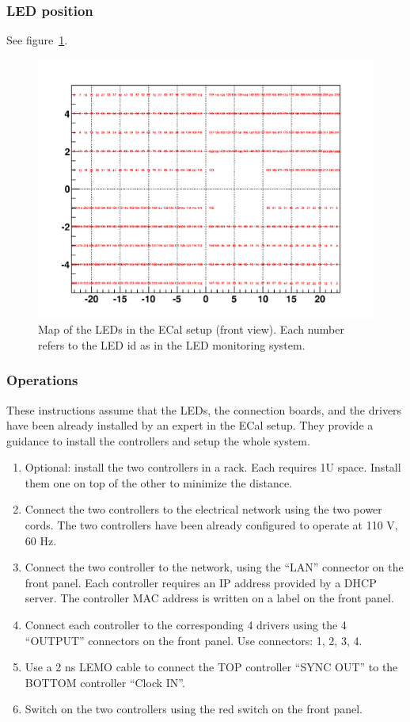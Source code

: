 \documentclass[12pt]{article}
\begin{document}
\subsubsection{LED position}

See figure~\ref{figLED}.

\begin{figure}
\center
\includegraphics[width=\textwidth]{LedPosition.png}
\caption{\small \label{figLED} Map of the LEDs in the ECal setup (front view). Each number refers to the LED id as in the LED monitoring system.}
\end{figure}

\subsubsection{Operations}

These instructions assume that the LEDs, the connection boards, and the drivers have been already installed by an expert in the ECal setup. They provide a guidance to install the controllers and setup the whole system.

\begin{enumerate}
\item{Optional: install the two controllers in a rack. Each requires 1U space. Install them one on top of the other to minimize the distance.}
\item{Connect the two controllers to the electrical network using the two power cords. The two controllers have been already configured to operate at 110 V, 60 Hz.}
\item{Connect the two controller to the network, using the ``LAN'' connector on the front panel. Each controller requires an IP address provided by a DHCP server. The controller MAC address is written on a label on the front panel.}
\item{Connect each controller to the corresponding 4 drivers using the 4 ``OUTPUT'' connectors on the front panel. Use connectors: 1, 2, 3, 4.}
\item{Use a 2 ns LEMO cable to connect the TOP controller ``SYNC OUT'' to the BOTTOM controller ``Clock IN''.}
\item{Switch on the two controllers using the red switch on the front panel.}
\end{enumerate}
\end{document}
